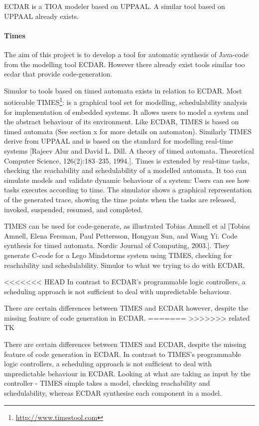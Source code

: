 ECDAR is a TIOA modeler based on UPPAAL. A similar tool based on UPPAAL already
exists.

\paragraph{Times}
The aim of this project is to develop a tool for automatic synthesis of Java-code from the modelling tool ECDAR. However there already exist tools similar too ecdar that provide code-generation.

Simulor to tools based on timed automata exists in relation to ECDAR. Most noticeable TIMES\footnote{\url{http://www.timestool.com}}: is a graphical tool set for modelling, schedulability analysis for implementation of embedded systems. It allows users to model a system and the abstract behaviour of its environment. 
Like ECDAR, TIMES is based on timed automata (See section x for more details on automaton). Similarly TIMES derive from UPPAAL and is based on the standard for modelling real-time systems [Rajeev Alur and David L. Dill. A theory of timed automata. Theoretical Computer
Science, 126(2):183–235, 1994.].
Times is extended by real-time tasks, checking the reachability and schedulability of a modelled automata. It too can simulate models and validate dynamic behaviour of a system: Users can see how tasks executes according to time. The simulator shows a graphical representation of the generated trace, showing the time points when the tasks are released, invoked, suspended, resumed, and completed.

TIMES can be used for code-generate, as illustrated Tobias Amnell et al [Tobias Amnell, Elena Fersman, Paul Pettersson, Hongyan Sun, and Wang Yi. Code
synthesis for timed automata. Nordic Journal of Computing, 2003.]. They generate C-code for a Lego Mindstorms system using TIMES, checking for reachability and schedulability. Simulor to what we trying to do with ECDAR. 

<<<<<<< HEAD
In contrast to ECDAR's programmable logic controllers, a scheduling approach is not sufficient to deal with unpredictable behaviour.

There are certain differences between TIMES and ECDAR however, despite the missing feature of code generation in ECDAR. 
=======
>>>>>>> related TK


There are certain differences between TIMES and ECDAR, despite the missing feature of code generation in ECDAR. In contrast to TIMES's programmable logic controllers, a scheduling approach is not sufﬁcient to deal with unpredictable behaviour in ECDAR.
Looking at what are taking as input by the controller - TIMES simple takes a model, checking reachability and schedulability, whereas ECDAR synthesise each component in a model.




